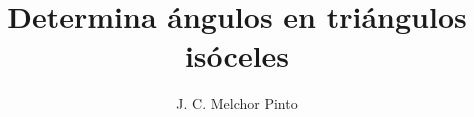 \documentclass[12pt]{guia}
\title{Determina ángulos en triángulos isóceles}
\author{J. C. Melchor Pinto}
\begin{document}
\pagestyle{headandfoot}
\addpoints
\INFO
\vspace{-0.9cm}
\begin{multicols}{2}
    
    
    \columnbreak
    
\end{multicols}

% 
% 
\begin{questions}
    \questionboxed[10] 
    \questionboxed[10] 
    \questionboxed[10] 
    \questionboxed[10] 
    \questionboxed[10] 
    \questionboxed[10] 
    \questionboxed[10] 
    \questionboxed[10] 
    \questionboxed[10] 
    \questionboxed[10] 
\end{questions}
\end{document}
